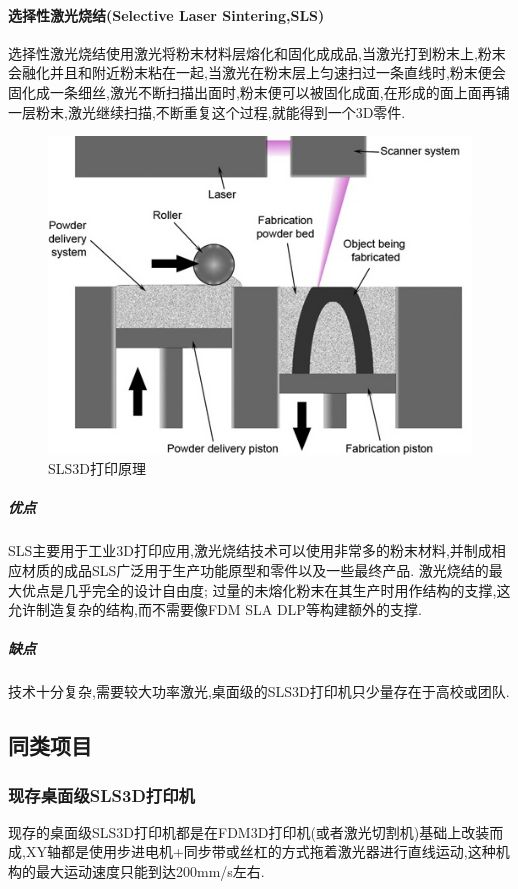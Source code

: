 \documentclass[a4paper,12pt,onecolumn,twoside]{article}
\begin{document}
\paragraph{选择性激光烧结(Selective Laser Sintering,SLS)}
选择性激光烧结使用激光将粉末材料层熔化和固化成成品,当激光打到粉末上,粉末会融化并且和附近粉末粘在一起,当激光在粉末层上匀速扫过一条直线时,粉末便会固化成一条细丝,激光不断扫描出面时,粉末便可以被固化成面,在形成的面上面再铺一层粉末,激光继续扫描,不断重复这个过程,就能得到一个3D零件.
\begin{figure}[htbp]
\centering     
\includegraphics[width=0.9\linewidth]{SLS0.jpg}
\caption{SLS3D打印原理}
\end{figure}
\subparagraph{优点}
SLS主要用于工业3D打印应用,激光烧结技术可以使用非常多的粉末材料,并制成相应材质的成品SLS广泛用于生产功能原型和零件以及一些最终产品. 激光烧结的最大优点是几乎完全的设计自由度; 过量的未熔化粉末在其生产时用作结构的支撑,这允许制造复杂的结构,而不需要像FDM SLA DLP等构建额外的支撑.
\subparagraph{缺点}
技术十分复杂,需要较大功率激光,桌面级的SLS3D打印机只少量存在于高校或团队. 
\subsection{同类项目}
\subsubsection{现存桌面级SLS3D打印机}
现存的桌面级SLS3D打印机都是在FDM3D打印机(或者激光切割机)基础上改装而成,XY轴都是使用步进电机+同步带或丝杠的方式拖着激光器进行直线运动,这种机构的最大运动速度只能到达200mm/s左右.
\end{document}
